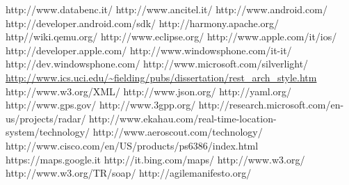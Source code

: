 
\begin{thesitography}{9}
 http://www.databenc.it/
 http://www.ancitel.it/
 http://www.android.com/
 http://developer.android.com/sdk/
 http://harmony.apache.org/
 http//wiki.qemu.org/
 http://www.eclipse.org/
 http://www.apple.com/it/ios/
 http://developer.apple.com/
 http://www.windowsphone.com/it-it/
 http://dev.windowsphone.com/
 http://www.microsoft.com/silverlight/
 \url{http://www.ics.uci.edu/~fielding/pubs/dissertation/rest_arch_style.htm}
 http://www.w3.org/XML/
 http://www.json.org/
 http://yaml.org/
 http://www.gps.gov/
 http://www.3gpp.org/
 http://research.microsoft.com/en-us/projects/radar/
 http://www.ekahau.com/real-time-location-system/technology/
 http://www.aeroscout.com/technology/
 http://www.cisco.com/en/US/products/ps6386/index.html
 https://maps.google.it
 http://it.bing.com/maps/
 http://www.w3.org/
 http://www.w3.org/TR/soap/
 http://agilemanifesto.org/
\end{thesitography}

\clearpage{\pagestyle{empty}\cleardoublepage}
